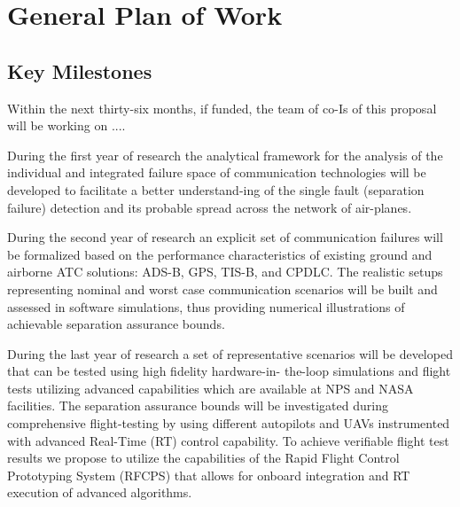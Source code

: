\documentclass[letter,onecolumn,12pt]{aiaa-tc}
\newcommand{\1}{1_n}
\begin{document}



\section{General Plan of Work}

\subsection{Key Milestones}

Within the next thirty-six months, if funded, the team of co-Is of this proposal will be working on ....

During the first year of research the analytical framework for the analysis of the individual and integrated failure space of communication technologies will be developed to facilitate a better understand-ing of the single fault (separation failure) detection and its probable spread across the network of air-planes.

During the second year of research an explicit set of communication failures will be formalized based on the performance characteristics of existing ground and airborne ATC solutions: ADS-B, GPS, TIS-B, and CPDLC. The realistic setups representing nominal and worst case communication scenarios will be built and assessed in software simulations, thus providing numerical illustrations of achievable separation assurance bounds.

During the last year of research a set of representative scenarios will be developed that can be tested using high fidelity hardware-in- the-loop simulations and flight tests utilizing advanced capabilities which are available at NPS and NASA facilities. The separation assurance bounds will be investigated during comprehensive flight-testing by using different autopilots and UAVs instrumented with advanced Real-Time (RT) control capability. To achieve verifiable flight test results we propose to utilize the capabilities of the Rapid Flight Control Prototyping System (RFCPS) that allows for onboard integration and RT execution of advanced algorithms.
\end{document}
